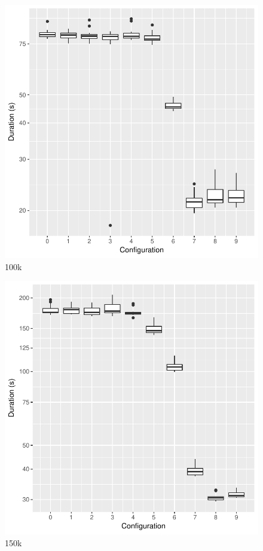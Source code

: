 \begin{figure}[htb]
        \includegraphics[width=\textwidth,keepaspectratio]{gfx/mean-durations-100k.pdf}
        \caption{100k}
        \label{fig:evaluation:performance:mean-durations-100k}
\end{figure}

\begin{figure}[htb]
        \includegraphics[width=\textwidth,keepaspectratio]{gfx/mean-durations-150k.pdf}
        \caption{150k}
        \label{fig:evaluation:performance:mean-durations-150k}
\end{figure}

